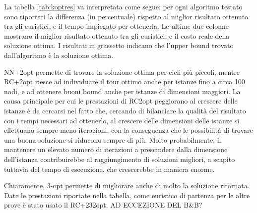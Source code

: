 La tabella \ref{tab:koptres} va interpretata come segue: per ogni algoritmo testato sono riportati la differenza (in percentuale) rispetto al miglior risultato ottenuto tra gli euristici, e il tempo impiegato per ottenerla. Le ultime due colonne mostrano il miglior risultato ottenuto tra gli euristici, e il costo reale della soluzione ottima. I risultati in grassetto indicano che l'upper bound trovato dall'algoritmo è la soluzione ottima.

NN+2opt permette di trovare la soluzione ottima per cicli più piccoli, mentre RC+2opt riesce ad individuare il tour ottimo anche per istanze fino a circa 100 nodi, e ad ottenere buoni bound anche per istanze di dimensioni maggiori. La causa principale per cui le prestazioni di RC2opt peggiorano al crescere delle istanze è da cercarsi nel fatto che, cercando di bilanciare la qualità del risultato con i tempi necessari ad ottenerlo, al crescere delle dimensioni delle istanze si effettuano sempre meno iterazioni, con la conseguenza che le possibilità di trovare una buona soluzione si riducono sempre di più. Molto probabilmente, il mantenere un elevato numero di iterazioni a prescindere dalla dimensione dell’istanza contribuirebbe al raggiungimento di soluzioni migliori, a scapito tuttavia del tempo di esecuzione, che crescerebbe in maniera enorme.

Chiaramente, 3-opt permette di migliorare anche di molto la soluzione ritornata. Date le prestazioni riportate nella tabella, come euristico di partenza per le altre prove è stato usato il RC+232opt. AD ECCEZIONE DEL B\&B?

